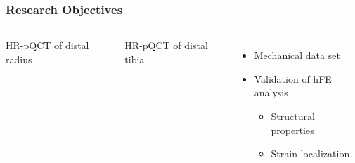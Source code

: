 \documentclass[xcolor=table,11pt]{beamer}
\begin{document}
\begin{frame}
\begin{columns}
		\end{columns}
		\vfill
		\hfill{}
	\end{frame}

	\begin{frame}
		\frametitle{Research Objectives}

		\begin{columns}
			HR-pQCT of distal radius 

			\vspace{1cm}

			HR-pQCT of distal tibia
			\begin{itemize}
				\item Mechanical data set
				\item Validation of hFE analysis
				\begin{itemize}
					\item Structural properties
					\item Strain localization
				\end{itemize}
			\end{itemize}


\end{columns}
\end{frame}
\end{document}
